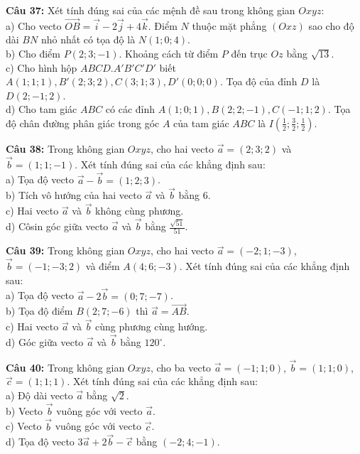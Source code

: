 \documentclass[12pt]{article}
\begin{document}
	\vspace{4mm}
	\noindent \textbf{Câu 37:} Xét tính đúng sai của các mệnh đề sau trong không gian $Oxyz$: \\
	\noindent a) Cho vecto $\vec{OB} = \vec{i} - 2\vec{j} + 4\vec{k}$. Điểm $N$ thuộc mặt phẳng $(Oxz)$ sao cho độ dài $BN$ nhỏ nhất có tọa độ là $N(1; 0; 4)$. \\
	\noindent b) Cho điểm $P(2; 3; -1)$. Khoảng cách từ điểm $P$ đến trục $Oz$ bằng $\sqrt{13}$. \\
	\noindent c) Cho hình hộp $ABCD.A'B'C'D'$ biết $A(1; 1; 1), B'(2; 3; 2), C(3; 1; 3), D'(0; 0; 0)$. Tọa độ của đỉnh $D$ là $D(2; -1; 2)$. \\
	\noindent d) Cho tam giác $ABC$ có các đỉnh $A(1; 0; 1), B(2; 2; -1), C(-1; 1; 2)$. Tọa độ chân đường phân giác trong góc $A$ của tam giác $ABC$ là $I\left(\frac{1}{2}; \frac{3}{2}; \frac{1}{2}\right)$.
	
	\vspace*{4mm}
	\noindent \textbf{Câu 38:} Trong không gian $Oxyz$, cho hai vecto $\vec{a} = (2; 3; 2)$ và $\vec{b} = (1; 1; -1)$. Xét tính đúng sai của các khẳng định sau: \\
	\noindent a) Tọa độ vecto $\vec{a} - \vec{b} = (1; 2; 3)$. \\
	\noindent b) Tích vô hướng của hai vecto $\vec{a}$ và $\vec{b}$ bằng $6$. \\
	\noindent c) Hai vecto $\vec{a}$ và $\vec{b}$ không cùng phương. \\
	\noindent d) Côsin góc giữa vecto $\vec{a}$ và $\vec{b}$ bằng $\frac{\sqrt{51}}{51}$.
	
	\vspace{4mm}
	\noindent \textbf{Câu 39:} Trong không gian $Oxyz$, cho hai vecto $\vec{a} = (-2; 1; -3)$, $\vec{b} = (-1; -3; 2)$ và điểm $A(4; 6; -3)$. Xét tính đúng sai của các khẳng định sau: \\
	\noindent a) Tọa độ vecto $\vec{a} - 2\vec{b} = (0; 7; -7)$. \\
	\noindent b) Tọa độ điểm $B(2; 7; -6)$ thì $\vec{a} = \vec{AB}$. \\
	\noindent c) Hai vecto $\vec{a}$ và $\vec{b}$ cùng phương cùng hướng. \\
	\noindent d) Góc giữa vecto $\vec{a}$ và $\vec{b}$ bằng $120^\circ$.
	
	\vspace{4mm}
	\noindent \textbf{Câu 40:} Trong không gian $Oxyz$, cho ba vecto $\vec{a} = (-1; 1; 0)$, $\vec{b} = (1; 1; 0)$, $\vec{c} = (1; 1; 1)$. Xét tính đúng sai của các khẳng định sau: \\
	\noindent a) Độ dài vecto $\vec{a}$ bằng $\sqrt{2}$. \\
	\noindent b) Vecto $\vec{b}$ vuông góc với vecto $\vec{a}$. \\
	\noindent c) Vecto $\vec{b}$ vuông góc với vecto $\vec{c}$. \\
	\noindent d) Tọa độ vecto $3\vec{a} + 2\vec{b} - \vec{c}$ bằng $(-2; 4; -1)$.
	
\end{document}
